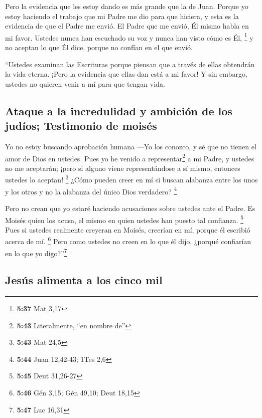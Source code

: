  Pero la evidencia que les estoy dando es más grande que
la de Juan. Porque yo estoy haciendo el trabajo que mi Padre me dio para
que hiciera,  y esta es la evidencia de que el Padre me
envió. El Padre que me envió, Él mismo habla en mi favor. Ustedes nunca
han escuchado su voz y nunca han visto cómo es Él, \footnote{\textbf{5:37}
  Mat 3,17}  y no aceptan lo que Él dice, porque no
confían en el que envió.

 ``Ustedes examinan las Escrituras porque piensan que a
través de ellas obtendrán la vida eterna. ¡Pero la evidencia que ellas
dan está a mi favor!  Y sin embargo, ustedes no quieren
venir a mí para que tengan vida.

\hypertarget{ataque-a-la-incredulidad-y-ambiciuxf3n-de-los-juduxedos-testimonio-de-moisuxe9s}{%
\subsection{Ataque a la incredulidad y ambición de los judíos;
Testimonio de
moisés}\label{ataque-a-la-incredulidad-y-ambiciuxf3n-de-los-juduxedos-testimonio-de-moisuxe9s}}

 Yo no estoy buscando aprobación humana 
---Yo los conozco, y sé que no tienen el amor de Dios en ustedes.
 Pues yo he venido a representar\footnote{\textbf{5:43}
  Literalmente, ``en nombre de''} a mi Padre, y ustedes no me aceptarán;
¡pero si alguno viene representándose a sí mismo, entonces ustedes lo
aceptan! \footnote{\textbf{5:43} Mat 24,5}  ¿Cómo pueden
creer en mí si buscan alabanza entre los unos y los otros y no la
alabanza del único Dios verdadero? \footnote{\textbf{5:44} Juan
  12,42-43; 1Tes 2,6}

 Pero no crean que yo estaré haciendo acusaciones sobre
ustedes ante el Padre. Es Moisés quien los acusa, el mismo en quien
ustedes han puesto tal confianza. \footnote{\textbf{5:45} Deut 31,26-27}
 Pues si ustedes realmente creyeran en Moisés, creerían
en mí, porque él escribió acerca de mí. \footnote{\textbf{5:46} Gén
  3,15; Gén 49,10; Deut 18,15}  Pero como ustedes no
creen en lo que él dijo, ¿porqué confiarían en lo que yo
digo?''\footnote{\textbf{5:47} Luc 16,31}

\hypertarget{jesuxfas-alimenta-a-los-cinco-mil}{%
\subsection{Jesús alimenta a los cinco
mil}\label{jesuxfas-alimenta-a-los-cinco-mil}}


